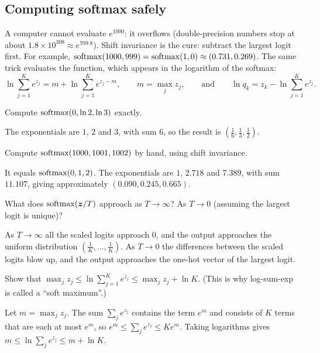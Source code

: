\subsection{Computing softmax safely}

A computer cannot evaluate $e^{1000}$: it overflows (double-precision numbers
stop at about $1.8\times10^{308} \approx e^{709.8}$). Shift invariance is the
cure: subtract the largest logit first. For example,
$\operatorname{softmax}(1000, 999) = \operatorname{softmax}(1, 0) \approx (0.731, 0.269)$. The same trick
evaluates the  function, which appears in the logarithm of
the softmax:
\[
  \ln\sum_{j=1}^K e^{z_j} = m + \ln\sum_{j=1}^K e^{z_j - m}, \qquad m = \max_j z_j,
  \qquad\text{and}\qquad
  \ln q_k = z_k - \ln\sum_{j=1}^K e^{z_j} .
\]

\sectionexercises

\begin{exercise}
Compute $\operatorname{softmax}(0, \ln2, \ln3)$ exactly.
\end{exercise}
\begin{solution}
The exponentials are $1$, $2$ and $3$, with sum $6$, so the result is
$\left(\tfrac16, \tfrac13, \tfrac12\right)$.
\end{solution}

\begin{exercise}
Compute $\operatorname{softmax}(1000, 1001, 1002)$ by hand, using shift invariance.
\end{exercise}
\begin{solution}
It equals $\operatorname{softmax}(0, 1, 2)$. The exponentials are $1$, $2.718$ and $7.389$, with
sum $11.107$, giving approximately $(0.090, 0.245, 0.665)$.
\end{solution}

\begin{exercise}
What does $\operatorname{softmax}(\bm{z}/T)$ approach as $T \to \infty$? As $T \to 0$ (assuming the
largest logit is unique)?
\end{exercise}
\begin{solution}
As $T \to \infty$ all the scaled logits approach $0$, and the output approaches
the uniform distribution $\left(\tfrac1K, \dots, \tfrac1K\right)$. As $T \to 0$ the
differences between the scaled logits blow up, and the output approaches the
one-hot vector of the largest logit.
\end{solution}

\begin{exercise}
Show that $\max_jz_j \le \ln\sum_{j=1}^Ke^{z_j} \le \max_jz_j + \ln K$. (This is why
log-sum-exp is called a ``soft maximum''.)
\end{exercise}
\begin{solution}
Let $m = \max_jz_j$. The sum $\sum_je^{z_j}$ contains the term $e^m$ and consists of
$K$ terms that are each at most $e^m$, so $e^m \le \sum_je^{z_j} \le Ke^m$. Taking
logarithms gives $m \le \ln\sum_je^{z_j} \le m + \ln K$.
\end{solution}

